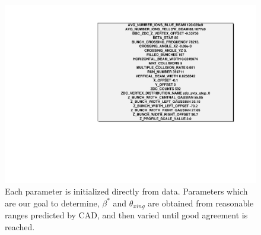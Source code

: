 \begin{figure}
\begin{center}
\includegraphics[width=\linewidth,height=\textheight,keepaspectratio]{../HourglassCorrection/figs/sample_configuration}
\caption{
Each parameter is initialized directly from data. Parameters which are our goal
to determine, $\beta^{*}$ and $\theta_{xing}$ are obtained from reasonable
ranges predicted by CAD, and then varied until good agreement is reached.
}
\label{fig:sample_configuration}
\end{center}
\end{figure}
